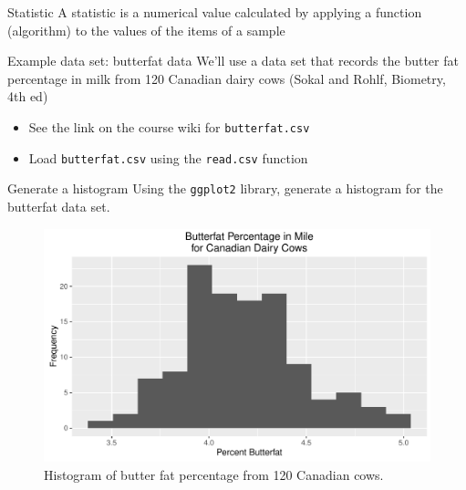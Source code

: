\documentclass[presentation]{beamer}
\begin{document}
\begin{frame}[label={sec:orgheadline6}]{Statistic}
A statistic is a numerical value calculated by applying a function (algorithm) to the values of the items of a sample 
\end{frame}


\begin{frame}[fragile,label={sec:orgheadline7}]{Example data set: butterfat data}
 We'll use a data set that records the butter fat percentage in milk from 120 Canadian dairy cows (Sokal and Rohlf, Biometry, 4th ed)

\begin{itemize}
\item See the link on the course wiki for \texttt{butterfat.csv}
\item Load \texttt{butterfat.csv} using the \texttt{read.csv} function
\end{itemize}
\end{frame}


\begin{frame}[fragile,label={sec:orgheadline8}]{Generate a histogram}
 Using the \texttt{ggplot2} library, generate a histogram for the butterfat data set.

\begin{figure}[htb]
\centering
\includegraphics[height=0.5\textheight]{butterfat-hist.pdf}
\caption{Histogram of butter fat percentage from 120 Canadian cows.}
\end{figure}
\end{frame}
\end{document}
